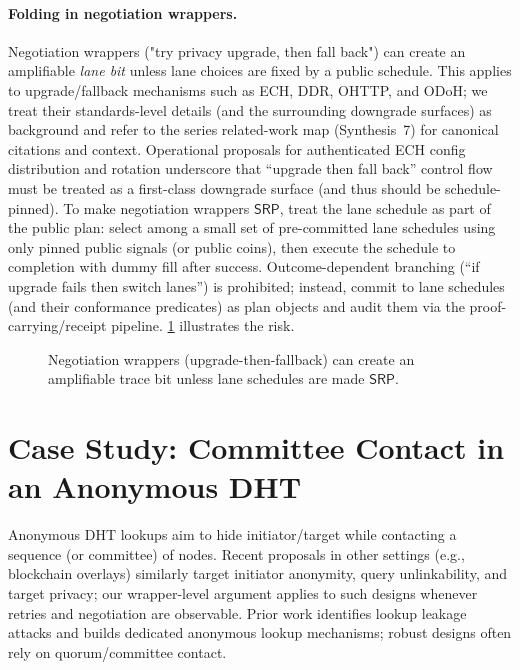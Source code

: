 \documentclass[11pt]{article}
\newcommand{\SRP}{\ensuremath{\mathsf{SRP}}}
\begin{document}
\paragraph{Folding in negotiation wrappers.}
Negotiation wrappers ("try privacy upgrade, then fall back") can create an amplifiable \emph{lane bit} unless lane choices are fixed by a public schedule.
This applies to upgrade/fallback mechanisms such as ECH, DDR, OHTTP, and ODoH; we treat their standards-level details (and the surrounding downgrade surfaces) as background and refer to the series related-work map (Synthesis~7) for canonical citations and context.\cite{series:relatedworkmap}
Operational proposals for authenticated ECH config distribution and rotation underscore that ``upgrade then fall back'' control flow must be treated as a first-class downgrade surface (and thus should be schedule-pinned).\cite{draftSullivanSignedEchUpdates2025}
To make negotiation wrappers \SRP, treat the lane schedule as part of the public plan: select among a small set of pre-committed lane schedules using only pinned public signals (or public coins), then execute the schedule to completion with dummy fill after success.
Outcome-dependent branching (``if upgrade fails then switch lanes'') is prohibited; instead, commit to lane schedules (and their conformance predicates) as plan objects and audit them via the proof-carrying/receipt pipeline.\cite{series:proofcarryingbudgets,series:releaseproperty}
\cref{fig:controlplane} illustrates the risk.

\begin{figure}[t]
  \centering
  \caption{Negotiation wrappers (upgrade-then-fallback) can create an amplifiable trace bit unless lane schedules are made \SRP.}
  \label{fig:controlplane}
\end{figure}

\section{Case Study: Committee Contact in an Anonymous DHT}
Anonymous DHT lookups aim to hide initiator/target while contacting a sequence (or committee) of nodes.
Recent proposals in other settings (e.g., blockchain overlays) similarly target initiator anonymity, query unlinkability, and target privacy; our wrapper-level argument applies to such designs whenever retries and negotiation are observable.\cite{tsengNCDHT2024}
Prior work identifies lookup leakage attacks and builds dedicated anonymous lookup mechanisms\cite{wangborisovLookupCCS2010,wangborisovOctopus2012}; robust designs often rely on quorum/committee contact\cite{backesQueryPrivacy2012}.
\end{document}
